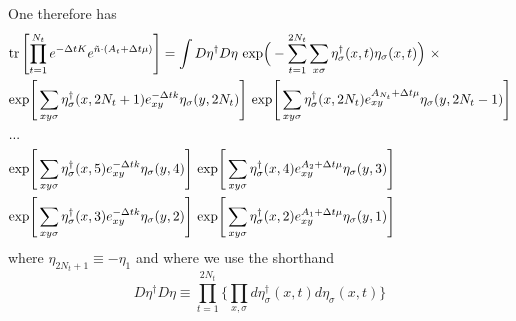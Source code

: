 One therefore has
\begin{align*}
& \text{tr}\left[\prod_{t=1}^{N_t} e^{-\Delta t K}  e^{ \tilde{n}\cdot (A_t + \Delta t \mu)} \right]  
=
\int{} D\eta^{\dagger} D\eta ~ \text{exp}\Big(- \sum_{t=1}^{2N_t}\sum_{x \sigma} \eta^{\dagger}_{\sigma}(x,t) \eta_{\sigma}(x,t)\Big)~ \times \\
&
\text{exp}\Bigg[ \sum_{xy\sigma} \eta^{\dagger}_{\sigma}(x,2N_t + 1) e^{-\Delta t k }_{xy} \eta_{\sigma}(y,2 N_t)\Bigg] 
~ 
\text{exp}\Bigg[ \sum_{xy\sigma} \eta^{\dagger}_{\sigma}(x,2N_t) e^{A_{N_t} + \Delta t \mu}_{xy} \eta_{\sigma}(y,2N_t - 1) \Bigg]  \\
& ... \\
& 
\text{exp}\Bigg[ \sum_{xy\sigma} \eta^{\dagger}_{\sigma}(x,5) e^{-\Delta t k }_{xy} \eta_{\sigma}(y,4)\Bigg] 
~ 
\text{exp}\Bigg[ \sum_{xy\sigma} \eta^{\dagger}_{\sigma}(x,4) e^{A_2 + \Delta t \mu}_{xy} \eta_{\sigma}(y,3) \Bigg]  \\
& 
\text{exp}\Bigg[ \sum_{xy\sigma} \eta^{\dagger}_{\sigma}(x,3) e^{-\Delta t k }_{xy} \eta_{\sigma}(y,2)\Bigg] 
~ 
\text{exp}\Bigg[ \sum_{xy\sigma} \eta^{\dagger}_{\sigma}(x,2) e^{A_1 + \Delta t \mu}_{xy} \eta_{\sigma}(y,1) \Bigg] 
\end{align*}
where $\eta_{2 N_t + 1} \equiv - \eta_1$ and where we use the shorthand
\begin{equation}
D\eta^{\dagger} D\eta \equiv \prod_{t=1}^{2N_t} \Bigg\{ \prod_{x, \sigma} d \eta^{\dagger}_{\sigma}(x,t) d\eta_{\sigma}(x,t) \Bigg\}
\end{equation}

